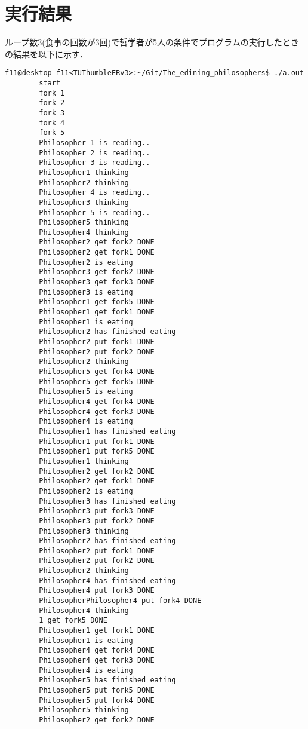 \documentclass[a4paper,dvipdfmx]{jsarticle}
\begin{document}
\section{実行結果}
    ループ数3(食事の回数が3回)で哲学者が5人の条件でプログラムの実行したときの結果を以下に示す．
    \begin{lstlisting}[caption=実行結果,label=run_res]
        f11@desktop-f11<TUThumbleERv3>:~/Git/The_edining_philosophers$ ./a.out
        start
        fork 1
        fork 2
        fork 3
        fork 4
        fork 5
        Philosopher 1 is reading..
        Philosopher 2 is reading..
        Philosopher 3 is reading..
        Philosopher1 thinking
        Philosopher2 thinking
        Philosopher 4 is reading..
        Philosopher3 thinking
        Philosopher 5 is reading..
        Philosopher5 thinking
        Philosopher4 thinking
        Philosopher2 get fork2 DONE 
        Philosopher2 get fork1 DONE 
        Philosopher2 is eating
        Philosopher3 get fork2 DONE 
        Philosopher3 get fork3 DONE 
        Philosopher3 is eating
        Philosopher1 get fork5 DONE 
        Philosopher1 get fork1 DONE 
        Philosopher1 is eating
        Philosopher2 has finished eating
        Philosopher2 put fork1 DONE 
        Philosopher2 put fork2 DONE 
        Philosopher2 thinking
        Philosopher5 get fork4 DONE 
        Philosopher5 get fork5 DONE 
        Philosopher5 is eating
        Philosopher4 get fork4 DONE 
        Philosopher4 get fork3 DONE 
        Philosopher4 is eating
        Philosopher1 has finished eating
        Philosopher1 put fork1 DONE 
        Philosopher1 put fork5 DONE 
        Philosopher1 thinking
        Philosopher2 get fork2 DONE 
        Philosopher2 get fork1 DONE 
        Philosopher2 is eating
        Philosopher3 has finished eating
        Philosopher3 put fork3 DONE 
        Philosopher3 put fork2 DONE 
        Philosopher3 thinking
        Philosopher2 has finished eating
        Philosopher2 put fork1 DONE 
        Philosopher2 put fork2 DONE 
        Philosopher2 thinking
        Philosopher4 has finished eating
        Philosopher4 put fork3 DONE 
        PhilosopherPhilosopher4 put fork4 DONE 
        Philosopher4 thinking
        1 get fork5 DONE 
        Philosopher1 get fork1 DONE 
        Philosopher1 is eating
        Philosopher4 get fork4 DONE 
        Philosopher4 get fork3 DONE 
        Philosopher4 is eating
        Philosopher5 has finished eating
        Philosopher5 put fork5 DONE 
        Philosopher5 put fork4 DONE 
        Philosopher5 thinking
        Philosopher2 get fork2 DONE 

\end{lstlisting}
\end{document}
